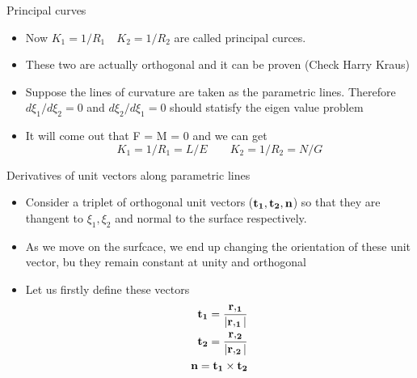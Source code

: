 	\begin{frame}{Principal curves}
		\begin{itemize}
			\item Now $K_1 =1/R_1 \quad K_2 =1/R_2$ are called principal curces.
			\item These two are actually orthogonal and it can be proven (Check Harry Kraus)
			\item Suppose the lines of curvature are taken as the parametric lines. Therefore $d\xi_1/d\xi_2 = 0$ and $d\xi_2/d\xi_1 = 0$ should statisfy the eigen value problem
			\item It will come out that F =  M = 0 and we can get
			\begin{equation}
			 K_1 = 1/R_1 = L/E \qquad K_2 = 1/R_2 = N/G
			\end{equation}
		\end{itemize}
	\end{frame}


	\begin{frame}{Derivatives of unit vectors along parametric lines}
		\begin{itemize}
			\item Consider a triplet of orthogonal unit vectors ($\mathbf{t_1,t_2,n}$) so that they are thangent to $\xi_1,\xi_2$ and normal to the surface respectively.
			\item As we move on the surfcace, we end up changing the orientation of these unit vector, bu they remain constant at unity and orthogonal
			\item Let us firstly define these vectors
			\begin{equation}
			\begin{aligned}
			\mathbf{t_1 = \frac{r,_1}{\mathbf{|r,_1|}}} \\
			\mathbf{t_2 = \frac{r,_2}{\mathbf{|r,_2|}}} \\
			\mathbf{n = t_1 \times t_2} \\
			\end{aligned}
			\end{equation}
			
		\end{itemize}
	\end{frame}


